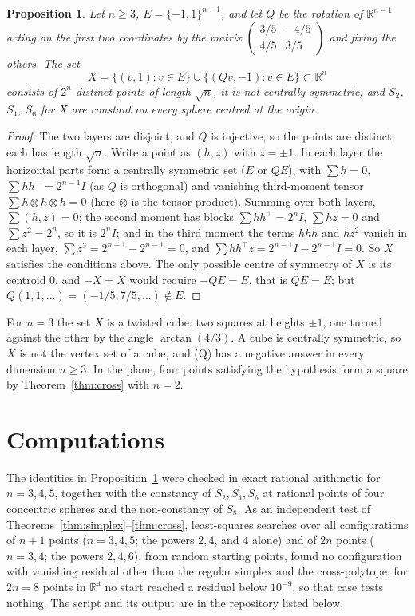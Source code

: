 \documentclass[11pt]{article}
\newtheorem{proposition}[theorem]{Proposition}
\theoremstyle{remark}
\begin{document}
\begin{proposition}\label{prop:cube}
Let $n\ge3$, $E=\{-1,1\}^{n-1}$, and let $Q$ be the rotation of $\mathbb{R}^{n-1}$ acting on the first two coordinates by the matrix $\begin{pmatrix}3/5&-4/5\\4/5&3/5\end{pmatrix}$ and fixing the others. The set
\[
X=\{(v,1):v\in E\}\cup\{(Qv,-1):v\in E\}\subset\mathbb{R}^n
\]
consists of $2^n$ distinct points of length $\sqrt n$, it is not centrally symmetric, and $S_2$, $S_4$, $S_6$ for $X$ are constant on every sphere centred at the origin.
\end{proposition}

\begin{proof}
The two layers are disjoint, and $Q$ is injective, so the points are distinct; each has length $\sqrt n$. Write a point as $(h,z)$ with $z=\pm1$. In each layer the horizontal parts form a centrally symmetric set ($E$ or $QE$), with $\sum h=0$, $\sum hh^{\top}=2^{n-1}I$ (as $Q$ is orthogonal) and vanishing third-moment tensor $\sum h\otimes h\otimes h=0$ (here $\otimes$ is the tensor product). Summing over both layers, $\sum(h,z)=0$; the second moment has blocks $\sum hh^{\top}=2^nI$, $\sum hz=0$ and $\sum z^2=2^n$, so it is $2^nI$; and in the third moment the terms $hhh$ and $h z^2$ vanish in each layer, $\sum z^3=2^{n-1}-2^{n-1}=0$, and $\sum hh^{\top}z=2^{n-1}I-2^{n-1}I=0$. So $X$ satisfies the conditions above. The only possible centre of symmetry of $X$ is its centroid $0$, and $-X=X$ would require $-QE=E$, that is $QE=E$; but $Q(1,1,\dots)=(-1/5,7/5,\dots)\notin E$.
\end{proof}

For $n=3$ the set $X$ is a twisted cube: two squares at heights $\pm1$, one turned against the other by the angle $\arctan(4/3)$. A cube is centrally symmetric, so $X$ is not the vertex set of a cube, and (Q) has a negative answer in every dimension $n\ge3$. In the plane, four points satisfying the hypothesis form a square by Theorem~\ref{thm:cross} with $n=2$.

\section{Computations}\label{sec:comp}
The identities in Proposition~\ref{prop:cube} were checked in exact rational arithmetic for $n=3,4,5$, together with the constancy of $S_2,S_4,S_6$ at rational points of four concentric spheres and the non-constancy of $S_8$. As an independent test of Theorems~\ref{thm:simplex}--\ref{thm:cross}, least-squares searches over all configurations of $n+1$ points ($n=3,4,5$; the powers $2,4$, and $4$ alone) and of $2n$ points ($n=3,4$; the powers $2,4,6$), from random starting points, found no configuration with vanishing residual other than the regular simplex and the cross-polytope; for $2n=8$ points in $\mathbb{R}^4$ no start reached a residual below $10^{-9}$, so that case tests nothing. The script and its output are in the repository listed below.
\end{document}
